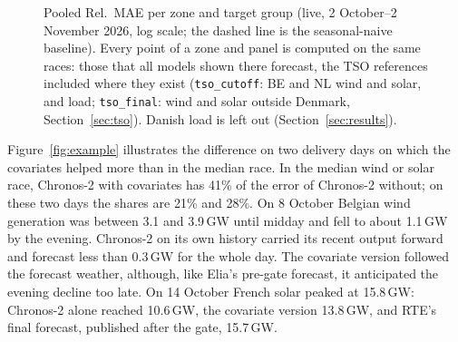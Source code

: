 \documentclass[11pt,a4paper]{article}
\newcommand{\m}[1]{\texttt{#1}}
\begin{document}
\begin{figure}[!htb]
\caption{Pooled Rel.\ MAE per zone and target group (live, 2 October--2 November 2026, log scale; the dashed line is the
seasonal-naive baseline). Every point of a zone and panel is computed on the same races: those that all models shown
there forecast, the TSO references included where they exist (\m{tso\_cutoff}: BE and NL wind and solar, and load;
\m{tso\_final}: wind and solar outside Denmark, Section~\ref{sec:tso}). Danish load is left out (Section~\ref{sec:results}).}
\label{fig:zones}
\end{figure}

Figure~\ref{fig:example} illustrates the difference on two delivery days on which the covariates helped more than in
the median race. In the median wind or solar race, Chronos-2 with covariates has 41\% of the error of Chronos-2
without; on these two days the shares are 21\% and 28\%. On 8 October Belgian wind generation was between 3.1 and
3.9\,GW until midday and fell to about 1.1\,GW by the evening. Chronos-2 on its own history carried its recent output
forward and forecast less than 0.3\,GW for the whole day. The covariate version followed the forecast
weather, although, like Elia's pre-gate forecast, it anticipated the evening decline too late. On 14 October French solar peaked at 15.8\,GW: Chronos-2 alone reached
10.6\,GW, the covariate version 13.8\,GW, and RTE's final forecast, published after the gate, 15.7\,GW.
\end{document}
